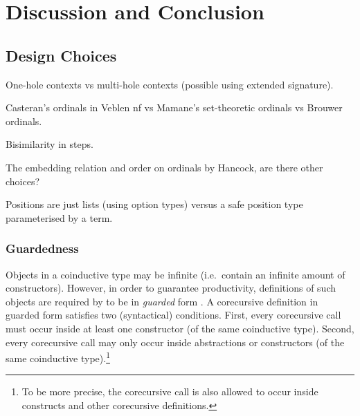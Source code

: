 \chapter{Discussion and Conclusion}\label{chap:discussion}


\section{Design Choices}

One-hole contexts vs multi-hole contexts (possible using extended signature).

Casteran's ordinals in Veblen nf vs Mamane's set-theoretic ordinals vs Brouwer
ordinals.

Bisimilarity in steps.

The embedding relation and order on ordinals by Hancock, are there other
choices?

Positions are just lists (using option types) versus a safe position
type parameterised by a term.


\subsection{Guardedness}\label{sub:guardedness}


Objects in a coinductive type may be infinite (i.e.\ contain an infinite
amount of constructors). However, in order to guarantee productivity,
definitions of such objects are required by \Coq to be in \emph{guarded}
form \citep{gimenez-94}. A corecursive definition in guarded form
satisfies two (syntactical) conditions. First, every corecursive call
must occur inside at least one constructor (of the same coinductive
type). Second, every corecursive call may only occur inside
abstractions or constructors (of the same coinductive
type).\footnote{To be more precise, the corecursive call is also
  allowed to occur inside  constructs and other
  corecursive definitions.}

